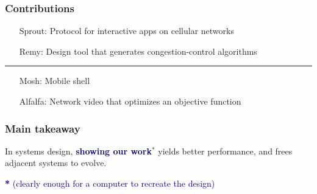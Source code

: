 \documentclass[svgnames]{beamer}
\begin{document}
\begin{frame}
\frametitle{Contributions}

\begin{itemize}

\item[Sprout:] Protocol for interactive apps on cellular networks


\item[]

\item[Remy:] Design tool that generates congestion-control algorithms


\item[]

\end{itemize}

\hrule

\begin{itemize}

\item[]

\item[Mosh:] Mobile shell


\item[]

\item[Alfalfa:] Network video that optimizes an objective function


\end{itemize}

\end{frame}

\begin{frame}
\frametitle{Main takeaway}

\Large

In systems design, \textbf{\textcolor{DarkBlue}{showing our
    work}$^{*}$} yields better performance, and frees adjacent systems
to evolve.

\vspace{\baselineskip}
\vspace{\baselineskip}
\vspace{\baselineskip}

\normalsize

\textcolor{DarkBlue}{\textbf{*} (clearly enough for a computer to recreate the design)}

\end{frame}
\end{document}
